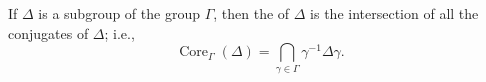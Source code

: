 If $\Delta$ is a subgroup of the group $\Gamma$, then the  of $\Delta$ is the intersection of all the conjugates of $\Delta$; i.e.,
$$\operatorname{Core}_\Gamma(\Delta) = \bigcap_{\gamma \in \Gamma} \gamma^{-1} \Delta \gamma.$$